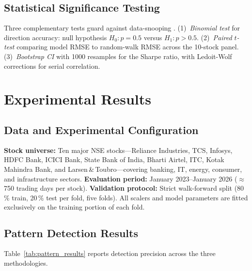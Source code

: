 \documentclass[ASNA,twocolumn]{USG}
\begin{document}
\subsection{Statistical Significance Testing}

Three complementary tests guard against data-snooping \citep{white2000,
sullivan1999}.
(1)~\emph{Binomial test} for direction accuracy: null hypothesis $H_0: p = 0.5$
versus $H_1: p > 0.5$.
(2)~\emph{Paired $t$-test} comparing model RMSE to random-walk RMSE across
the 10-stock panel.
(3)~\emph{Bootstrap CI} with 1000 resamples for the Sharpe ratio, with
Ledoit-Wolf \citep{ledoit2008} corrections for serial correlation.

\section{Experimental Results}\label{sec:results}

\subsection{Data and Experimental Configuration}

\textbf{Stock universe:} Ten major NSE stocks---Reliance Industries, TCS,
Infosys, HDFC Bank, ICICI Bank, State Bank of India, Bharti Airtel, ITC,
Kotak Mahindra Bank, and Larsen\,\&\,Toubro---covering banking, IT,
energy, consumer, and infrastructure sectors.
\textbf{Evaluation period:} January 2023--January 2026
($\approx$750 trading days per stock).
\textbf{Validation protocol:} Strict walk-forward split (80\,\% train,
20\,\% test per fold, five folds). All scalers and model parameters are
fitted exclusively on the training portion of each fold.

\subsection{Pattern Detection Results}

Table~\ref{tab:pattern_results} reports detection precision across the three
methodologies.
\end{document}
